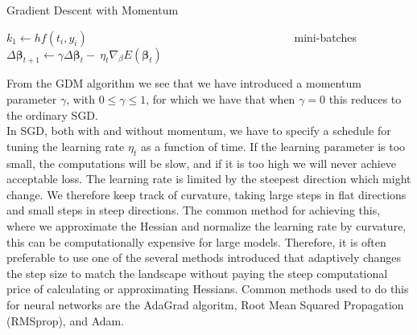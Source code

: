 \documentclass[english,notitlepage,reprint,nofootinbib]{revtex4-2}  %
\begin{document}
\begin{algorithm}[H]
    \caption{Gradient Descent with Momentum}\label{algo:GDM}
    \begin{algorithmic}
        \State $k_1 \leftarrow hf(t_i,y_i)$  
         
        \State $\:\:\:\:\:\:\:\:\:\:\:\:\:\:\:\:\:\:\:\:\:\:\:\:\:\:\:\:\:\:\:\:\:\:\:\:\:\:\:\:\:\:\:\:\:\:\:\:\:\:\:\:\:\:\:\:\:\:\:\:\:\:\:\:\:\:\:\:\:\:\:\:\:\:\:\:\:\:\:\:$ mini-batches
        \State $\Delta \boldsymbol{\beta}_{t+1} \leftarrow 
                \gamma \Delta \boldsymbol{\beta}_t -\ \eta_{t}\nabla_\beta E(\boldsymbol{\beta}_t)$ 
        \EndWhile
    \end{algorithmic}
\end{algorithm}
From the GDM algorithm we see that we have introduced a momentum parameter $\gamma$, with $0\leq\gamma\leq 1$, for which we have that when $\gamma = 0$ this reduces to the ordinary SGD. 
\vspace{3mm}
\\ 
In SGD, both with and without momentum, we have to specify a schedule for tuning the learning rate $\eta_t$ as a function of time. 
If the learning parameter is too small, the computations will be slow, and if it is too high we will never achieve acceptable loss. 
The learning rate is limited by the steepest direction which might change. We therefore keep track of curvature, taking large steps in flat directions and small steps in steep directions. 
The common method for achieving this, where we approximate the Hessian and normalize the learning rate by curvature, this can be computationally expensive for large models. Therefore, it is often preferable to use one of the several methods introduced that adaptively changes the step size to match the landscape without paying the steep computational price of calculating or approximating Hessians. Common methods used to do this for neural networks are the AdaGrad algoritm, Root Mean Squared Propagation (RMSprop), and Adam. 
\end{document}
